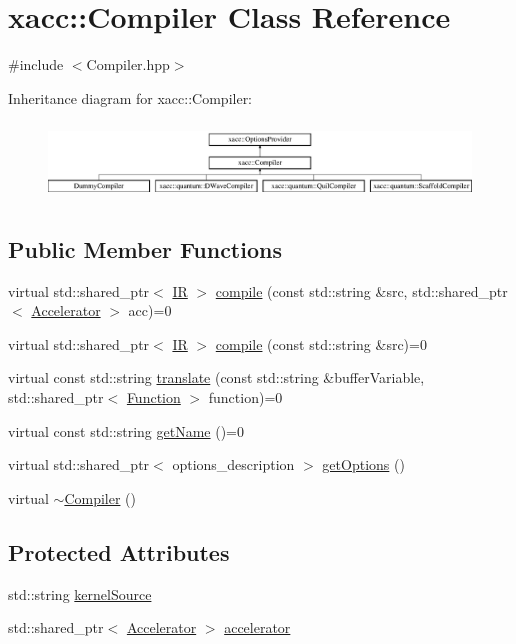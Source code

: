 \hypertarget{a01451}{}\section{xacc\+:\+:Compiler Class Reference}
\label{a01451}


{\ttfamily \#include $<$Compiler.\+hpp$>$}

Inheritance diagram for xacc\+:\+:Compiler\+:\begin{figure}[H]
\begin{center}
\leavevmode
\includegraphics[height=2.079208cm]{a01451}
\end{center}
\end{figure}
\subsection*{Public Member Functions}
\begin{DoxyCompactItemize}
\item 
virtual std\+::shared\+\_\+ptr$<$ \hyperlink{a01499}{IR} $>$ \hyperlink{a01451_a546a40c95bb93af6a0c0ac48dbeaffc8}{compile} (const std\+::string \&src, std\+::shared\+\_\+ptr$<$ \hyperlink{a01435}{Accelerator} $>$ acc)=0
\item 
virtual std\+::shared\+\_\+ptr$<$ \hyperlink{a01499}{IR} $>$ \hyperlink{a01451_a9092f5f779b570c91569b59621280c04}{compile} (const std\+::string \&src)=0
\item 
virtual const std\+::string \hyperlink{a01451_aeedbe58a33fed29e4d7694ae743e25e7}{translate} (const std\+::string \&buffer\+Variable, std\+::shared\+\_\+ptr$<$ \hyperlink{a01475}{Function} $>$ function)=0
\item 
virtual const std\+::string \hyperlink{a01451_a87fca9100e6462122f5b687c3a0fb3fb}{get\+Name} ()=0
\item 
virtual std\+::shared\+\_\+ptr$<$ options\+\_\+description $>$ \hyperlink{a01451_a9f5a8965c9c2dd895016d18264ebbe92}{get\+Options} ()
\item 
virtual \hyperlink{a01451_a5d0b012687d9b44893872eaa81e47b38}{$\sim$\+Compiler} ()
\end{DoxyCompactItemize}
\subsection*{Protected Attributes}
\begin{DoxyCompactItemize}
\item 
std\+::string \hyperlink{a01451_a0ad81c816c09e5113d03cdc02165c453}{kernel\+Source}
\item 
std\+::shared\+\_\+ptr$<$ \hyperlink{a01435}{Accelerator} $>$ \hyperlink{a01451_ad4cbb467fa7e377bac6c054ffcb22b7c}{accelerator}
\end{DoxyCompactItemize}


